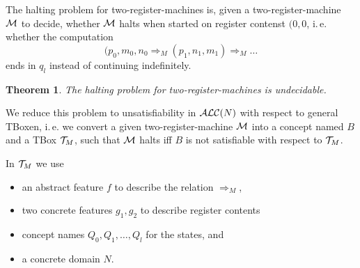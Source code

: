 \documentclass[openany]{scrbook}
\theoremstyle{break}
\newtheorem{Theorem}{Theorem}[chapter]
\theoremstyle{nonumberbreak}
\theoremstyle{nonumberplain}
\theoremstyle{nonumberbreak}
\newcommand{\then}{\Longrightarrow}
\newcommand{\ie}{i{.}\,e{.}\xspace}
\newcommand{\ALC}{{\cal A}{\cal L}{\cal C}}
\begin{document}
The halting problem for two-register-machines is, given a
two-register-machine ${\cal M}$ to decide, whether ${\cal M}$ halts
when started on register contenst $(0, 0$, \ie whether the computation
\begin{equation*}
  (p_0, m_0, n_0 \then_M (p_1, n_1, m_1) \then_M \dotso
\end{equation*}
ends in $q_l$ instead of continuing indefinitely.

\begin{Theorem}
  \label{7.11}
  The halting problem for two-register-machines is undecidable.
\end{Theorem}

We reduce this problem to unsatisfiability in $\ALC(N)$ with respect
to general TBoxen, \ie we convert a given two-register-machine ${\cal
  M}$ into a concept named $B$ and a TBox ${\cal T}_M$, such that
${\cal M}$ halts iff $B$ is not satisfiable with respect to ${\cal
  T}_M$.

In ${\cal T}_M$ we use
\begin{itemize}
\item an abstract feature $f$ to describe the relation $\then_M$,
\item two concrete features $g_1, g_2$ to describe register contents
\item concept names $Q_0, Q_1, \dotsc, Q_l$ for the states, and
\item a concrete domain $N$.
\end{itemize}
\end{document}
